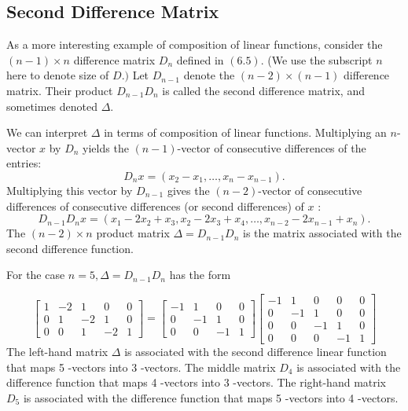 \subsection{Second Difference Matrix}

As a more interesting example of composition of linear functions, consider the $ (n-1) \times n $ difference matrix $ D_{n} $ defined in $ (6.5) $. (We use the subscript $ n $ here to denote size of $ D .) $ Let $ D_{n-1} $ denote the $ (n-2) \times(n-1) $ difference matrix. Their product $ D_{n-1} D_{n} $ is called the second difference matrix, and sometimes denoted $ \Delta $.

We can interpret $ \Delta $ in terms of composition of linear functions. Multiplying an $ n $-vector $ x $ by $ D_{n} $ yields the $ (n-1) $-vector of consecutive differences of the entries:
\begin{equation}
D_{n} x=\left(x_{2}-x_{1}, \ldots, x_{n}-x_{n-1}\right) .
\end{equation}
Multiplying this vector by $ D_{n-1} $ gives the $ (n-2) $-vector of consecutive differences of consecutive differences (or second differences) of $ x $ :
\begin{equation}
D_{n-1} D_{n} x=\left(x_{1}-2 x_{2}+x_{3}, x_{2}-2 x_{3}+x_{4}, \ldots, x_{n-2}-2 x_{n-1}+x_{n}\right) .
\end{equation}
The $ (n-2) \times n $ product matrix $ \Delta=D_{n-1} D_{n} $ is the matrix associated with the second difference function.

\begin{example}
    For the case $ n=5, \Delta=D_{n-1} D_{n} $ has the form

    \begin{equation}
\left[\begin{array}{rrrrr}
1 & -2 & 1 & 0 & 0 \\
0 & 1 & -2 & 1 & 0 \\
0 & 0 & 1 & -2 & 1
\end{array}\right]=\left[\begin{array}{rrrr}
-1 & 1 & 0 & 0 \\
0 & -1 & 1 & 0 \\
0 & 0 & -1 & 1
\end{array}\right]\left[\begin{array}{rrrrr}
-1 & 1 & 0 & 0 & 0 \\
0 & -1 & 1 & 0 & 0 \\
0 & 0 & -1 & 1 & 0 \\
0 & 0 & 0 & -1 & 1
\end{array}\right]
\end{equation}
The left-hand matrix $ \Delta $ is associated with the second difference linear function that maps 5 -vectors into 3 -vectors. The middle matrix $ D_{4} $ is associated with the difference function that maps 4 -vectors into 3 -vectors. The right-hand matrix $ D_{5} $ is associated with the difference function that maps 5 -vectors into 4 -vectors.

\end{example}

